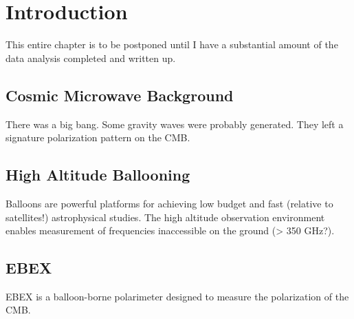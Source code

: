 \chapter{Introduction}
\label{intro_chapter}

This entire chapter is to be postponed until I have a substantial amount of the data analysis completed and written up. 


\section{Cosmic Microwave Background}
\label{cmb_science_section}
There was a big bang. Some gravity waves were probably generated. They left a signature polarization pattern on the CMB. 


\section{High Altitude Ballooning}
\label{ballooning_section}
Balloons are powerful platforms for achieving low budget and fast (relative to satellites!) astrophysical studies. The high altitude observation environment enables measurement of frequencies inaccessible on the ground (> 350 GHz?). 


\section{EBEX}
\label{ebex_section}
EBEX is a balloon-borne polarimeter designed to measure the polarization of the CMB. 


